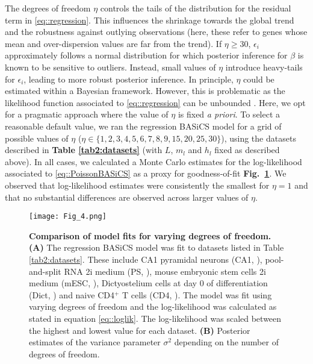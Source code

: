 The degrees of freedom $\eta$ controls the tails of the distribution for the residual term in \ref{eq::regression}. This influences the shrinkage towards the global trend and the robustness against outlying observations (here, these refer to genes whose mean and over-dispersion values are far from the trend).  If $\eta \geq 30$, $\epsilon_i$ approximately follows a normal distribution for which posterior inference for $\beta$ is known to be sensitive to outliers. Instead, small values of $\eta$ introduce heavy-tails for $\epsilon_i$, leading to more robust posterior inference. In principle, $\eta$ could be estimated within a Bayesian framework. However, this is problematic as the likelihood function associated to \ref{eq::regression} can be unbounded \citep{Fernandez1999}. Here, we opt for a pragmatic approach where the value of $\eta$ is fixed \emph{a priori}. To select a reasonable default value, we ran the regression BASiCS model for a grid of possible values of $\eta$ ($\eta \in \{ 1,2,3,4,5,6,7,8,9,15,20,25,30 \}$), using the datasets described in \textbf{Table \ref{tab2:datasets}} (with $L$, $m_l$ and $h_l$ fixed as described above). In all cases, we calculated a Monte Carlo estimates for the log-likelihood associated to \ref{eq::PoissonBASiCS} as a proxy for goodness-of-fit \textbf{Fig.~\ref{fig2:DoF}}. We observed that log-likelihood estimates were consistently the smallest for $\eta=1$ and that no substantial differences are observed across larger values of $\eta$. \\ 

\begin{figure}[!h]
\centering
\texttt{[image: Fig\_4.png]}
\caption[Comparison of model fits for varying degrees of freedom]{\textbf{Comparison of model fits for varying degrees of freedom.}\\
\textbf{(A)} The regression BASiCS model was fit to datasets listed in Table \ref{tab2:datasets}. These include CA1 pyramidal neurons (CA1, \citep{Zeisel2015}), pool-and-split RNA 2i medium (PS, \citep{Grun2014}), mouse embryonic stem cells 2i medium (mESC, \citep{Grun2014}), Dictyostelium cells at day 0 of differentiation (Dict, \citep{Antolovic2017}) and naive CD4$^+$ T cells (CD4, \citep{Martinez-jimenez2017}). The model was fit using varying degrees of freedom and the log-likelihood was calculated as stated in equation \ref{eq::loglik}. The log-likelihood was scaled between the highest and lowest value for each dataset. \textbf{(B)} Posterior estimates of the variance parameter $\sigma^2$ depending on the number of degrees of freedom.}
\label{fig2:DoF}
\end{figure}

